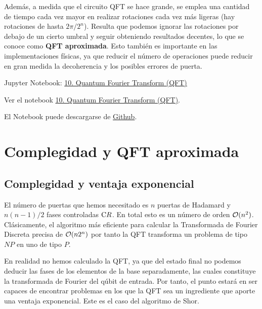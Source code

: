 \documentclass[a4paper,11pt]{book} %
\numberwithin{equation}{chapter}
\newcommand{\cg}[1]{{\rm C}#1}
\begin{document}
Además, a medida que el circuito QFT se hace grande, se emplea una cantidad de tiempo cada vez mayor en realizar rotaciones cada vez más ligeras (hay rotaciones de hasta $2\pi/2^n$). Resulta que podemos ignorar las rotaciones por debajo de un cierto umbral y seguir obteniendo resultados decentes, lo que se conoce como \textbf{QFT aproximada}. Esto también es importante en las implementaciones físicas, ya que reducir el número de operaciones puede reducir en gran medida la decoherencia y los posibles errores de puerta.
 
	\begin{mybox_orange}{Jupyter Notebook: \href{https://www.scbi.uma.es/web/wp-content/uploads/Jupyterbook/CICC_UMA/Notebooks/html/docs/Part_01/Chapter_10-QFT_myst.html}{10. Quantum Fourier Transform (QFT)}}
	
	Ver el notebook \href{https://www.scbi.uma.es/web/wp-content/uploads/Jupyterbook/CICC_UMA/Notebooks/html/docs/Part_01/Chapter_10-QFT_myst.html}{10. Quantum Fourier Transform (QFT)}.
	
	El Notebook puede descargarse de \href{https://github.com/davidcb98/CICC_UMA/blob/master/Notebooks/Part_01/Chapter_10-QFT.ipynb}{Github}.	
	\end{mybox_orange}

	
	
\section{Complegidad y QFT aproximada}

	\subsection{Complegidad y ventaja exponencial}
	
El número de puertas que hemos necesitado es $n$ puertas de Hadamard y $n(n-1)/2$ fases controladas $\cg{R}$. En total esto es un número de orden ${\cal O}(n^2)$.  Clásicamente, el algoritmo más eficiente para calcular la Transformada de Fourier Discreta precisa de ${\cal O}(n 2^n)$ por tanto la QFT transforma un problema de tipo  $NP$ en uno de tipo $P$. 

En realidad no hemos calculado la QFT, ya que del estado final no podemos deducir las fases  de los elementos de la base separadamente, las cuales constituye la transformada de Fourier del qúbit de entrada. Por tanto, el punto estará en ser capaces de encontrar problemas en los que la QFT sea un ingrediente que aporte una ventaja exponencial. Este es el caso del algoritmo de Shor.
\end{document}
